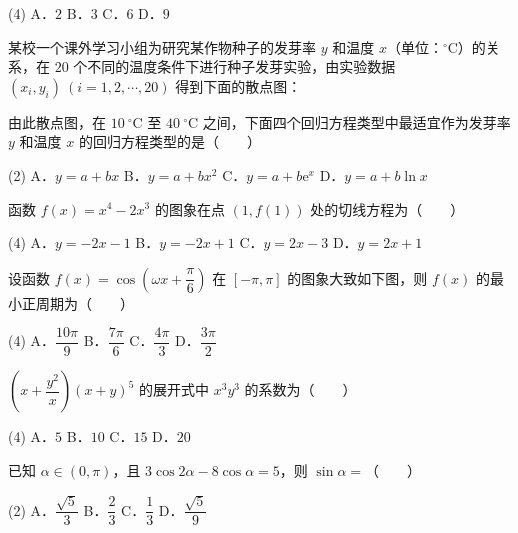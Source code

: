 \begin{gkopts}(4)
\task A．$2$
\task B．$3$
\task C．$6$
\task D．$9$
\end{gkopts}

某校一个课外学习小组为研究某作物种子的发芽率 $y$ 和温度 $x$（单位：$^\circ\mathrm C$）的关系，在 $20$ 个不同的温度条件下进行种子发芽实验，由实验数据 $\left(x_i,y_i\right)\ (i=1,2,\cdots,20)$ 得到下面的散点图：

\begin{center}\end{center}

由此散点图，在 $10\ ^\circ\mathrm C$ 至 $40\ ^\circ\mathrm C$ 之间，下面四个回归方程类型中最适宜作为发芽率 $y$ 和温度 $x$ 的回归方程类型的是（　　）

\begin{gkopts}(2)
\task A．$y=a+bx$
\task B．$y=a+bx^{2}$
\task C．$y=a+b\mathrm e^{x}$
\task D．$y=a+b\ln x$
\end{gkopts}

函数 $f(x)=x^{4}-2x^{3}$ 的图象在点 $(1,f(1))$ 处的切线方程为（　　）

\begin{gkopts}(4)
\task A．$y=-2x-1$
\task B．$y=-2x+1$
\task C．$y=2x-3$
\task D．$y=2x+1$
\end{gkopts}

设函数 $f(x)=\cos\left(\omega x+\dfrac\pi6\right)$ 在 $[-\pi,\pi]$ 的图象大致如下图，则 $f(x)$ 的最小正周期为（　　）

\begin{center}\end{center}

\begin{gkopts}(4)
\task A．$\dfrac{10\pi}9$
\task B．$\dfrac{7\pi}6$
\task C．$\dfrac{4\pi}3$
\task D．$\dfrac{3\pi}2$
\end{gkopts}

$\left(x+\dfrac{y^{2}}x\right)(x+y)^{5}$ 的展开式中 $x^{3}y^{3}$ 的系数为（　　）

\begin{gkopts}(4)
\task A．$5$
\task B．$10$
\task C．$15$
\task D．$20$
\end{gkopts}

已知 $\alpha\in(0,\pi)$，且 $3\cos2\alpha-8\cos\alpha=5$，则 $\sin\alpha=$（　　）

\begin{gkopts}(2)
\task A．$\dfrac{\sqrt5}3$
\task B．$\dfrac23$
\task C．$\dfrac13$
\task D．$\dfrac{\sqrt5}9$
\end{gkopts}

